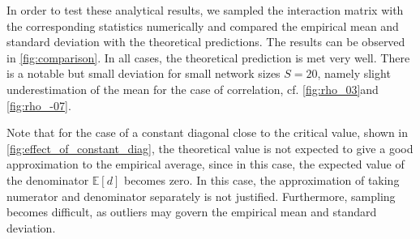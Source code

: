 \documentclass[10pt]{article}
\begin{document}
In order to test these analytical results, we sampled the interaction matrix with
the corresponding statistics numerically and compared the empirical mean 
and standard deviation with the theoretical predictions. 
The results can be observed in \autoref{fig:comparison}. 
In all cases, the theoretical prediction is met very well. 
There is a notable but small deviation for small network sizes  $S = 20$, 
namely slight underestimation of the mean for the case of correlation, 
cf. \autoref{fig:rho_03}and \autoref{fig:rho_-07}. 

Note that for the case of a constant diagonal close to the critical value,
shown in \autoref{fig:effect_of_constant_diag}, 
the theoretical value is not expected to give a good 
approximation to the empirical average, since in this case, 
the expected value of the denominator $\mathbb{E}[d]$ becomes 
zero. In this case, the approximation of taking numerator 
and denominator separately is not justified. Furthermore, 
sampling becomes difficult, as outliers may govern the empirical 
mean and standard deviation. 
\end{document}
